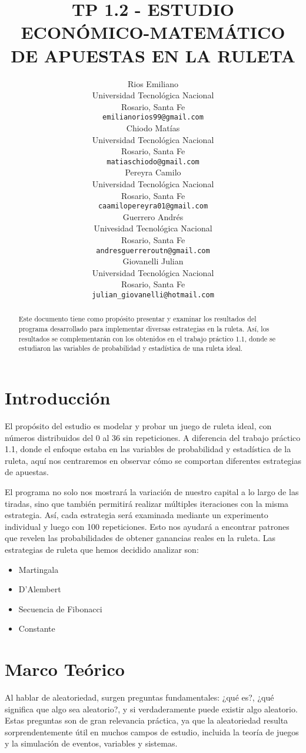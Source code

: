 \documentclass{article}
\title{TP 1.2 - ESTUDIO ECONÓMICO-MATEMÁTICO DE APUESTAS EN LA RULETA}
\author{
  Rios Emiliano\\
  Universidad Tecnológica Nacional\\
  Rosario, Santa Fe  \\
  \texttt{emilianorios99@gmail.com} \\
  \And
  Chiodo Matías\\
  Universidad Tecnológica Nacional\\
  Rosario, Santa Fe  \\
  \texttt{matiaschiodo@gmail.com} \\
  \And
  Pereyra Camilo\\
  Universidad Tecnológica Nacional\\
  Rosario, Santa Fe\\
  \texttt{caamilopereyra01@gmail.com} \\
  \And
  Guerrero Andrés\\
  Univesidad Tecnológica Nacional\\
  Rosario, Santa Fe \\
  \texttt {andresguerreroutn@gmail.com} \\
  \And
  Giovanelli Julian\\
  Universidad Tecnológica Nacional\\
  Rosario, Santa Fe  \\
  \texttt{julian\_giovanelli@hotmail.com} \\
}
\begin{document}
\maketitle
\begin{abstract}
Este documento tiene como propósito presentar y examinar los resultados del programa desarrollado para implementar diversas estrategias en la ruleta. Así, los resultados se complementarán con los obtenidos en el trabajo práctico 1.1, donde se estudiaron las variables de probabilidad y estadística de una ruleta ideal.
\end{abstract}

\section{Introducción}
El propósito del estudio es modelar y probar un juego de ruleta ideal, con números distribuidos del 0 al 36 sin repeticiones. A diferencia del trabajo práctico 1.1, donde el enfoque estaba en las variables de probabilidad y estadística de la ruleta, aquí nos centraremos en observar cómo se comportan diferentes estrategias de apuestas.

El programa no solo nos mostrará la variación de nuestro capital a lo largo de las tiradas, sino que también permitirá realizar múltiples iteraciones con la misma estrategia. Así, cada estrategia será examinada mediante un experimento individual y luego con 100 repeticiones. Esto nos ayudará a encontrar patrones que revelen las probabilidades de obtener ganancias reales en la ruleta. Las estrategias de ruleta que hemos decidido analizar son:

\begin{itemize}

\item Martingala
\item D'Alembert
\item Secuencia de Fibonacci
\item Constante

\end{itemize}

\section{Marco Teórico}
Al hablar de aleatoriedad, surgen preguntas fundamentales: ¿qué es?, ¿qué significa que algo sea aleatorio?, y si verdaderamente puede existir algo aleatorio. Estas preguntas son de gran relevancia práctica, ya que la aleatoriedad resulta sorprendentemente útil en muchos campos de estudio, incluida la teoría de juegos y la simulación de eventos, variables y sistemas.
\end{document}
